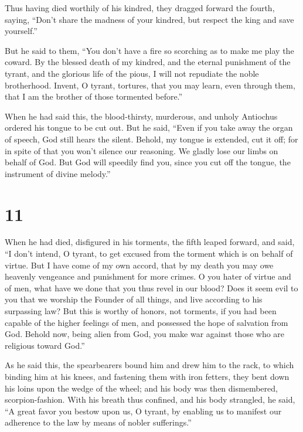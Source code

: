  Thus having died worthily of his kindred, they dragged
forward the fourth, saying,  ``Don't share the madness of
your kindred, but respect the king and save yourself.''

 But he said to them, ``You don't have a fire so scorching
as to make me play the coward.  By the blessed death of my
kindred, and the eternal punishment of the tyrant, and the glorious life
of the pious, I will not repudiate the noble brotherhood. 
Invent, O tyrant, tortures, that you may learn, even through them, that
I am the brother of those tormented before.''

 When he had said this, the blood-thirsty, murderous, and
unholy Antiochus ordered his tongue to be cut out.  But he
said, ``Even if you take away the organ of speech, God still hears the
silent.  Behold, my tongue is extended, cut it off; for in
spite of that you won't silence our reasoning.  We gladly
lose our limbs on behalf of God.  But God will speedily
find you, since you cut off the tongue, the instrument of divine
melody.''

\hypertarget{section-10}{%
\section{11}\label{section-10}}

 When he had died, disfigured in his torments, the fifth
leaped forward, and said,  ``I don't intend, O tyrant, to
get excused from the torment which is on behalf of virtue. 
But I have come of my own accord, that by my death you may owe heavenly
vengeance and punishment for more crimes.  O you hater of
virtue and of men, what have we done that you thus revel in our blood?
 Does it seem evil to you that we worship the Founder of all
things, and live according to his surpassing law?  But this
is worthy of honors, not torments,  if you had been capable
of the higher feelings of men, and possessed the hope of salvation from
God.  Behold now, being alien from God, you make war against
those who are religious toward God.''

 As he said this, the spearbearers bound him and drew him to
the rack,  to which binding him at his knees, and fastening
them with iron fetters, they bent down his loins upon the wedge of the
wheel; and his body was then dismembered, scorpion-fashion.
 With his breath thus confined, and his body strangled, he
said,  ``A great favor you bestow upon us, O tyrant, by
enabling us to manifest our adherence to the law by means of nobler
sufferings.''

